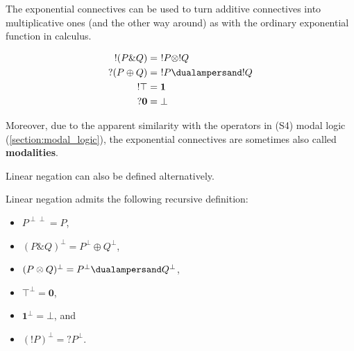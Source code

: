     The exponential connectives can be used to turn additive connectives into multiplicative ones (and the other way around) as with the ordinary exponential function in calculus.
    \begin{property}
        \begin{gather}
            \begin{aligned}
                !(P\& Q) &=\ !P\otimes!Q\\
                ?(P\oplus Q) &=\ !P\dualampersand!Q\\
                !\top &= \mathbf{1}\\
                ?\mathbf{0} &= \bot
            \end{aligned}
        \end{gather}
    \end{property}
    Moreover, due to the apparent similarity with the operators in (S4) modal logic (\cref{section:modal_logic}), the exponential connectives are sometimes also called \textbf{modalities}.

    Linear negation can also be defined alternatively.
    \begin{property}[Negation]\label{quantum_information:negation}
        Linear negation admits the following recursive definition:
        \begin{itemize}
            \item $P^{\perp\perp}=P$,
            \item $(P\& Q)^\perp=P^\perp\oplus Q^\perp$,
            \item $(P\otimes Q)^\perp=P^\perp\dualampersand Q^\perp$,
            \item $\top^\perp=\mathbf{0}$,
            \item $\mathbf{1}^\perp=\bot$, and
            \item $(!P)^\perp=?P^\perp$.
        \end{itemize}
    \end{property}

